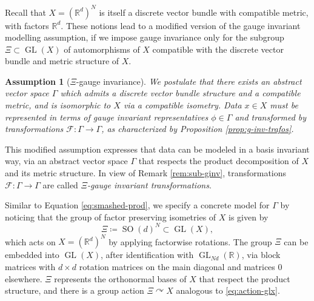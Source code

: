\documentclass[10pt,reqno]{amsart}
\numberwithin{equation}{section}
\theoremstyle{bfnote}
\theoremstyle{bfdef}
\newtheorem{assumption}[theorem]{Assumption}
\newcommand{\mc}[1]{\mathcal{#1}}
\newcommand{\R}{\mathbb{R}}
\DeclareMathOperator{\SO}{SO}
\DeclareMathOperator{\GL}{GL}
\providecommand\x; %
\renewcommand{\x}{x}
\providecommand\X; %
\renewcommand{\X}{X}
\begin{document}
	Recall that $X = (\R^d)^N$ is itself a discrete vector bundle with compatible metric, with factors $\R^d$. These notions lead to a modified version of the gauge invariant modelling assumption, if we impose gauge invariance only for the subgroup $\Xi \subset \GL(\X)$ of automorphisms of $X$ compatible with the discrete vector bundle and metric structure of $\X$.
	\begin{assumption}[$\Xi$-gauge invariance]\label{as:sod-ginv}
		We postulate that there exists an abstract vector space $\Gamma$ which admits a discrete vector bundle structure and a compatible metric, and is isomorphic to $\X$ via a compatible isometry. Data $\x \in \X$ must be represented in terms of gauge invariant representatives $\phi \in \Gamma$ and transformed by transformations $\mc{F} : \Gamma \to \Gamma$, as characterized by Proposition \ref{prop:g-inv-trafos}.
	\end{assumption}
	This modified assumption expresses that data can be modeled in a basis invariant way, via an abstract vector space $\Gamma$ that respects the product decomposition of $\X$ and its metric structure. In view of Remark \ref{rem:sub-ginv}, transformations $\mc{F} : \Gamma \to \Gamma$ are called \textit{$\Xi$-gauge invariant transformations}.

	Similar to Equation \eqref{eq:smashed-prod}, we specify a concrete model for $\Gamma$ by noticing that the group of factor preserving isometries of $\X$ is given by
	\begin{equation}\label{eq:choice-Xi}
		\Xi \coloneqq \SO(d)^N \subset \GL(\X),
	\end{equation}
	which acts on $\X = (\R^d)^N$ by applying factorwise rotations. The group $\Xi$ can be embedded into $\GL(\X)$, after identification with $\GL_{Nd}(\R)$, via block matrices with $d \times d$ rotation matrices on the main diagonal and matrices 0 elsewhere. $\Xi$ represents the orthonormal bases of $\X$ that respect the product structure, and there is a group action $\Xi \curvearrowright \X$ analogous to \eqref{eq:action-glx}.
\end{document}
